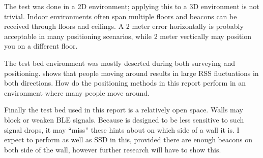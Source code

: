 The test was done in a 2D environment; applying this to a 3D environment is not trivial.
Indoor environments often span multiple floors and beacons can be received through floors and ceilings.
A 2 meter error horizontally is probably acceptable in many positioning scenarios, while 2 meter vertically may position you on a different floor.

The test bed environment was mostly deserted during both surveying and positioning.
 shows that people moving around results in large RSS fluctuations in both directions.
How do the positioning methods in this report perform in an environment where many people move around.

Finally the test bed used in this report is a relatively open space.
Walls may block or weaken BLE signals.
Because \aBRP is designed to be less sensitive to such signal drops, it may ``miss'' these hints about on which side of a wall it is.
I expect \aBRP to perform as well as SSD in this, provided there are enough beacons on both side of the wall, however further research will have to show this.


